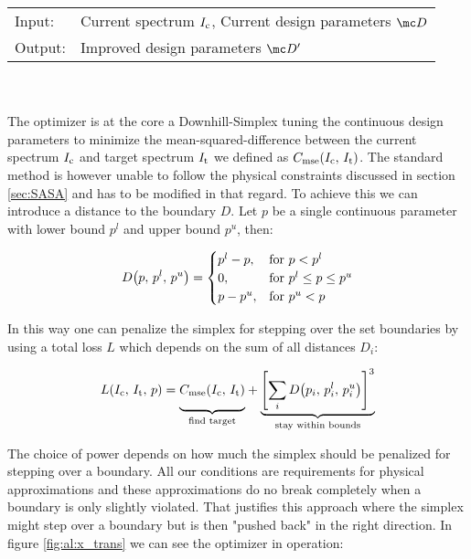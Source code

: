 \begin{tabular}{ll}
    \toprule
    Input: &
    Current spectrum $I_{\mathrm{c}}$, 
    Current design parameters $\mc D$\\
    Output: & 
    Improved design parameters $\mc D'$\\
    \bottomrule
\end{tabular}
\\
\\
The optimizer is at the core a Downhill-Simplex \cite{Nelder1965} tuning the continuous design parameters to minimize the mean-squared-difference between the current spectrum $I_{\mathrm{c}}$ and target spectrum $I_{\mathrm{t}}$ we defined as 
$C_{\mathrm{mse}}\qty(I_{\mathrm{c}}, \, I_{\mathrm{t}})$.
The standard method is however unable to follow the physical constraints discussed in section \ref{sec:SASA} and has to be modified in that regard. To achieve this we can introduce a distance to the boundary $D$. Let $p$ be a single continuous parameter with lower bound $p^l$ and upper bound $p^u$, then:

\begin{equation}
    D\qty(p, \, p^l, \, p^u) =
    \begin{cases}
        p^l - p, & \text{for } p < p^l\\
        0, & \text{for } p^l \leq p \leq p^u\\
        p - p^u, & \text{for } p^u < p
    \end{cases}
\end{equation}

\noindent
In this way one can penalize the simplex for stepping over the set boundaries by using a total loss $L$ which depends on the sum of all distances $D_i$:

\begin{equation}
    L(I_\s{c}, \,I_\s{t}, \,p) =
    {\underbrace{%
    \vphantom{ \left(\frac{a^{0.3}}{b}\right) }
    C_\s{mse}(I_\s{c}, \, I_\s{t})}_{\text{find target}}}
    +
    {\underbrace{%
    \qty[\sum_i D\qty(p_i, \, p_i^l, \, p_i^u)]^3
    }_{\text{stay within bounds}}}\\
\end{equation}

The choice of power depends on how much the simplex should be penalized for stepping over a boundary. All our conditions are requirements for physical approximations and these approximations do no break completely when a boundary is only slightly violated. That justifies this approach where the simplex might step over a boundary but is then "pushed back" in the right direction. In figure \ref{fig:al:x_trans} we can see the optimizer in operation:

